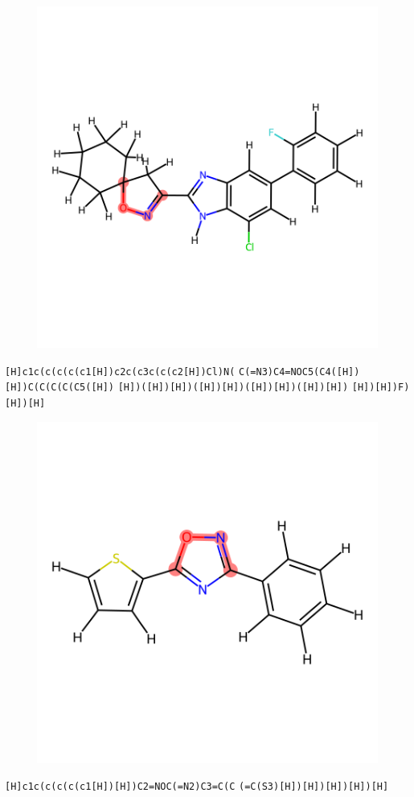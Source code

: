 \documentclass{article}
\begin{document}
\begin{figure}[ht]
\centering
    \includegraphics{mol24.png}
\end{figure}
\verb|[H]c1c(c(c(c(c1[H])c2c(c3c(c(c2[H])Cl)N(| \verb|C(=N3)C4=NOC5(C4([H])[H])C(C(C(C(C5([H])| \verb|[H])([H])[H])([H])[H])([H])[H])([H])[H])| \verb|[H])[H])F)[H])[H]|

\begin{figure}[ht]
\centering
    \includegraphics{mol25.png}
\end{figure}
\verb|[H]c1c(c(c(c(c1[H])[H])C2=NOC(=N2)C3=C(C| \verb|(=C(S3)[H])[H])[H])[H])[H]|
\end{document}
